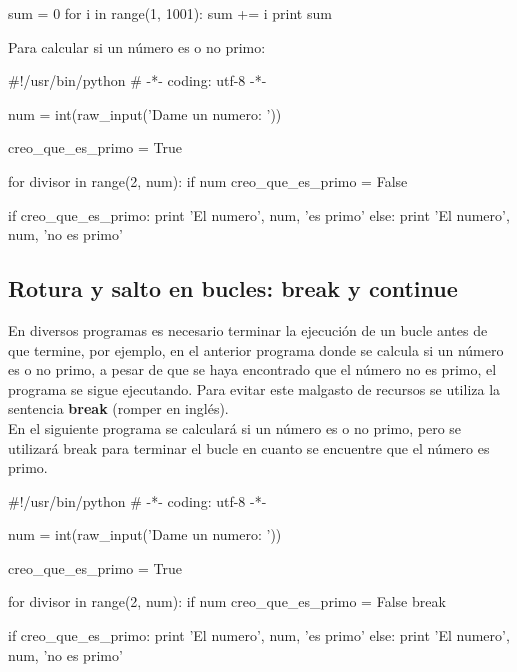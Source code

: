 \begin{pyglist} [language=python]
sum = 0
for i in range(1, 1001):
    sum += i
print sum
\end{pyglist}

Para calcular si un número es o no primo:\\

\begin{pyglist} [language=python]
#!/usr/bin/python
# -*- coding: utf-8 -*-

num = int(raw_input('Dame un numero: '))

creo_que_es_primo = True

for divisor in range(2, num):
    if num %
        creo_que_es_primo = False
        
if creo_que_es_primo:
    print 'El numero', num, 'es primo'
else:
    print 'El numero', num, 'no es primo'
\end{pyglist}

\subsection{Rotura y salto en bucles: break y continue}

En diversos programas es necesario terminar la ejecución de un bucle antes de que termine, por ejemplo, en el anterior programa donde se calcula si un número es o no primo, a pesar de que se haya encontrado que el número no es primo, el programa se sigue ejecutando. Para evitar este malgasto de recursos se utiliza la sentencia \textbf{break} (romper en inglés).\\

En el siguiente programa se calculará si un número es o no primo, pero se utilizará break para terminar el bucle en cuanto se encuentre que el número es primo.\\

\begin{pyglist} [language=python]
#!/usr/bin/python
# -*- coding: utf-8 -*-

num = int(raw_input('Dame un numero: '))

creo_que_es_primo = True

for divisor in range(2, num):
    if num %
        creo_que_es_primo = False
        break

if creo_que_es_primo:
    print 'El numero', num, 'es primo'
else:
    print 'El numero', num, 'no es primo'
\end{pyglist}

